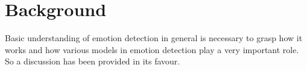 \documentclass[runningheads]{llncs}
\begin{document}




%
%

\section{Background}
Basic understanding of emotion detection in general is necessary to grasp how it works and how various models in emotion detection play a very important role. So a discussion has been provided in its favour.
\end{document}
